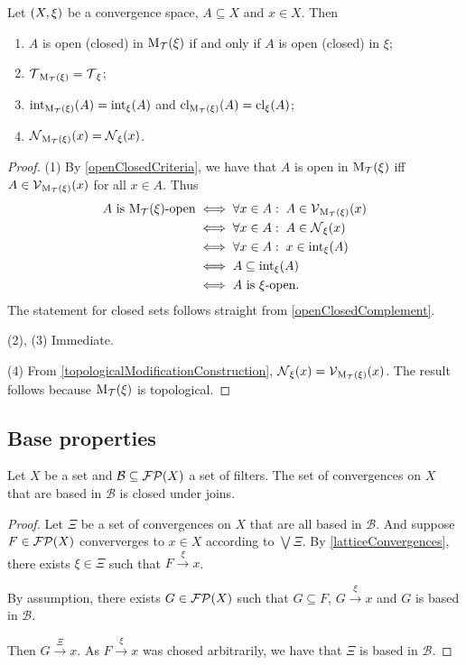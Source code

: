 \begin{proposition} \label{topologicalModificationPreservation}
Let $\left( X,\xi \right)$ be a convergence space, $A\subseteq X$ and $x\in X$. Then
\begin{enumerate}
\item $A$ is open (closed) in $\operatorname{M_\mathcal{T}}(\xi)$ \textup{if and only if} $A$ is open (closed) in $\xi$;
\item $\operatorname{\mathcal{T}}_{\operatorname{M_\mathcal{T}}(\xi)} = \operatorname{\mathcal{T}}_\xi$;
\item $\operatorname{int}_{\operatorname{M_\mathcal{T}}(\xi)}(A) = \operatorname{int}_{\xi}(A)$ and $\operatorname{cl}_{\operatorname{M_\mathcal{T}}(\xi)}(A) = \operatorname{cl}_{\xi}(A)$;
\item $\operatorname{\mathcal{N}}_{\operatorname{M_\mathcal{T}}(\xi)}(x) = \operatorname{\mathcal{N}}_\xi(x)$.
\end{enumerate}
\end{proposition}
\begin{proof}
(1) By \ref{openClosedCriteria}, we have that $A$ is open in $\operatorname{M_\mathcal{T}}(\xi)$ iff $A\in \operatorname{\mathcal{V}}_{\operatorname{M_\mathcal{T}}(\xi)}(x)$ for all $x\in A$. Thus
\begin{align*}
\text{$A$ is $\operatorname{M_\mathcal{T}}(\xi)$-open} &\iff \forall x\in A: \; A\in \operatorname{\mathcal{V}}_{\operatorname{M_\mathcal{T}}(\xi)}(x) \\
&\iff \forall x\in A: \; A\in \operatorname{\mathcal{N}}_\xi(x) \\
&\iff \forall x\in A: \; x\in \operatorname{int}_\xi(A) \\
&\iff A\subseteq \operatorname{int}_\xi(A) \\
&\iff \text{$A$ is $\xi$-open}.
\end{align*}
The statement for closed sets follows straight from \ref{openClosedComplement}.

(2), (3) Immediate.

(4) From \ref{topologicalModificationConstruction}, $\operatorname{\mathcal{N}}_\xi(x) = \operatorname{\mathcal{V}}_{\operatorname{M_\mathcal{T}}(\xi)}(x)$. The result follows because $\operatorname{M_\mathcal{T}}(\xi)$ is topological.
\end{proof}

\subsection{Base properties}
\begin{lemma}
Let $X$ be a set and $\mathcal{B}\subseteq \operatorname{\mathcal{FP}}(X)$ a set of filters. The set of convergences on $X$ that are based in $\mathcal{B}$ is closed under joins.
\end{lemma}
\begin{proof}
Let $\Xi$ be a set of convergences on $X$ that are all based in $\mathcal{B}$. And suppose $F\in\operatorname{\mathcal{FP}}(X)$ conververges to $x\in X$ according to $\bigvee \Xi$. By \ref{latticeConvergences}, there exists $\xi\in \Xi$ such that $F\overset{\xi}{\longrightarrow} x$.

By assumption, there exists $G\in\operatorname{\mathcal{FP}}(X)$ such that $G\subseteq F$, $G\overset{\xi}{\longrightarrow} x$ and $G$ is based in $\mathcal{B}$.

Then $G\overset{\Xi}{\longrightarrow} x$. As $F\overset{\xi}{\longrightarrow} x$ was chosed arbitrarily, we have that $\Xi$ is based in $\mathcal{B}$.
\end{proof}

